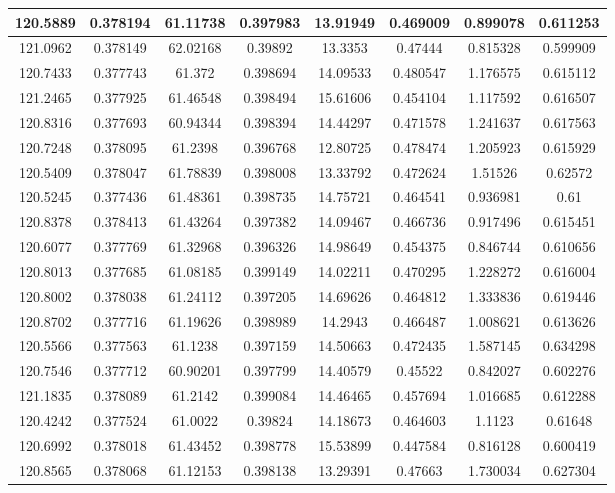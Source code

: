 \documentclass[preprint,review,11pt]{elsarticle}
\begin{document}
\begin{longtable}{|c|c|c|c|c|c|c|c|}
				120.5889 & 0.378194 & 61.11738 & 0.397983 & 13.91949 & 0.469009 & 0.899078 & 0.611253 \\ \hline
				121.0962 & 0.378149 & 62.02168 & 0.39892  & 13.3353  & 0.47444  & 0.815328 & 0.599909 \\ \hline
				120.7433 & 0.377743 & 61.372   & 0.398694 & 14.09533 & 0.480547 & 1.176575 & 0.615112 \\ \hline
				121.2465 & 0.377925 & 61.46548 & 0.398494 & 15.61606 & 0.454104 & 1.117592 & 0.616507 \\ \hline
				120.8316 & 0.377693 & 60.94344 & 0.398394 & 14.44297 & 0.471578 & 1.241637 & 0.617563 \\ \hline
				120.7248 & 0.378095 & 61.2398  & 0.396768 & 12.80725 & 0.478474 & 1.205923 & 0.615929 \\ \hline
				120.5409 & 0.378047 & 61.78839 & 0.398008 & 13.33792 & 0.472624 & 1.51526  & 0.62572  \\ \hline
				120.5245 & 0.377436 & 61.48361 & 0.398735 & 14.75721 & 0.464541 & 0.936981 & 0.61     \\ \hline
				120.8378 & 0.378413 & 61.43264 & 0.397382 & 14.09467 & 0.466736 & 0.917496 & 0.615451 \\ \hline
				120.6077 & 0.377769 & 61.32968 & 0.396326 & 14.98649 & 0.454375 & 0.846744 & 0.610656 \\ \hline
				120.8013 & 0.377685 & 61.08185 & 0.399149 & 14.02211 & 0.470295 & 1.228272 & 0.616004 \\ \hline
				120.8002 & 0.378038 & 61.24112 & 0.397205 & 14.69626 & 0.464812 & 1.333836 & 0.619446 \\ \hline
				120.8702 & 0.377716 & 61.19626 & 0.398989 & 14.2943  & 0.466487 & 1.008621 & 0.613626 \\ \hline
				120.5566 & 0.377563 & 61.1238  & 0.397159 & 14.50663 & 0.472435 & 1.587145 & 0.634298 \\ \hline
				120.7546 & 0.377712 & 60.90201 & 0.397799 & 14.40579 & 0.45522  & 0.842027 & 0.602276 \\ \hline
				121.1835 & 0.378089 & 61.2142  & 0.399084 & 14.46465 & 0.457694 & 1.016685 & 0.612288 \\ \hline
				120.4242 & 0.377524 & 61.0022  & 0.39824  & 14.18673 & 0.464603 & 1.1123   & 0.61648  \\ \hline
				120.6992 & 0.378018 & 61.43452 & 0.398778 & 15.53899 & 0.447584 & 0.816128 & 0.600419 \\ \hline
				120.8565 & 0.378068 & 61.12153 & 0.398138 & 13.29391 & 0.47663  & 1.730034 & 0.627304 \\ \hline

\end{longtable}
\end{document}
